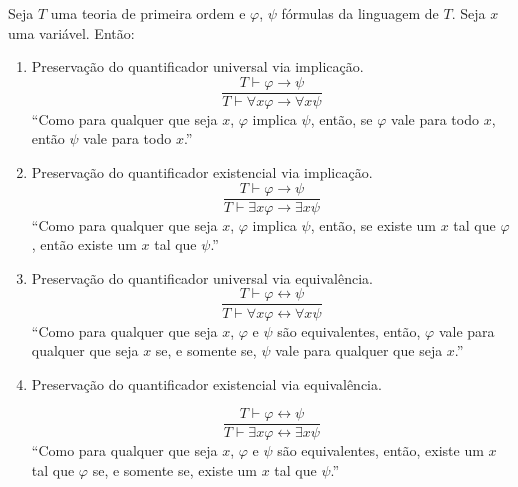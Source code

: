 \begin{metaproposition}\label{mprop:quantificadoresImplicacao}
    Seja $T$ uma teoria de primeira ordem e $\varphi$, $\psi$ fórmulas da linguagem de $T$.
    Seja $x$ uma variável.
    Então:
    \begin{enumerate}[label=(\roman*)]
        \item Preservação do quantificador universal via implicação.
        \[
        \frac{T\vdash \varphi\rightarrow\psi}
             {T\vdash \forall x\varphi\rightarrow\forall x\psi}
        \]
        ``Como para qualquer que seja $x$, $\varphi$ implica $\psi$, então, se $\varphi$ vale para todo $x$, então $\psi$ vale para todo $x$.''
        \item Preservação do quantificador existencial via implicação.
        \[
        \frac{T\vdash \varphi\rightarrow\psi}
             {T\vdash \exists x\varphi\rightarrow\exists x\psi}
        \]
        ``Como para qualquer que seja $x$, $\varphi$ implica $\psi$, então, se existe um $x$ tal que $\varphi$, então existe um $x$ tal que $\psi$.''
        \item Preservação do quantificador universal via equivalência.
        \[
        \frac{T\vdash \varphi\leftrightarrow\psi}
             {T\vdash \forall x\varphi\leftrightarrow\forall x\psi}
        \]
        ``Como para qualquer que seja $x$, $\varphi$ e $\psi$ são equivalentes, então, $\varphi$ vale para qualquer que seja $x$ se, e somente se, $\psi$ vale para qualquer que seja $x$.''
        \item Preservação do quantificador existencial via equivalência.
        
        \[
        \frac{T\vdash \varphi\leftrightarrow\psi}
             {T\vdash \exists x\varphi\leftrightarrow\exists x\psi}
        \]
        ``Como para qualquer que seja $x$, $\varphi$ e $\psi$ são equivalentes, então, existe um $x$ tal que $\varphi$ se, e somente se, existe um $x$ tal que $\psi$.''
    \end{enumerate}
\end{metaproposition}

